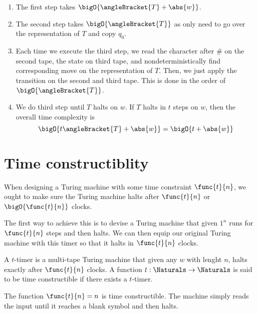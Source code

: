 \begin{enumerate}
    \item The first step takes \(\bigO{\angleBracket{T} + \abs{w}}\).
    \item The second step takes \(\bigO{\angleBracket{T}}\) as only need to go over the representation of \(T\) and copy \(q_0\).
    \item Each time we execute the third step, we read the character after \(\#\) on the second tape, the state on third tape, and nondeterministically find corresponding move on the representation of \(T\). Then, we just apply the transition on the second and third tape. This is done in the order of \(\bigO{\angleBracket{T}}\). 
    \item We do third step until \(T\) halts on \(w\). If \(T\) halts in \(t\) steps on \(w\), then the overall time complexity is 
    \begin{equation*}
        \bigO{t \angleBracket{T} + \abs{w} } = \bigO{t + \abs{w}}
    \end{equation*}
\end{enumerate}

\section{Time constructiblity}
When designing a Turing machine with some time constraint \(\func{t}{n}\), we ought to make sure the Turing machine halts after \(\func{t}{n}\) or \(\bigO{\func{t}{n}}\) clocks. 

The first way to achieve this is to devise a Turing machine that given \(1^n\) runs for \(\func{t}{n}\) steps and then halts. We can then equip our original Turing machine with this timer so that it halts in \(\func{t}{n}\) clocks.
\begin{definition}
    A \(t\)-timer is a multi-tape Turing machine that given any \(w\) with lenght \(n\), halts exactly after \(\func{t}{n}\) clocks. A function \(t:\Naturals \to \Naturals\) is said to be time constructible if there exists a \(t\)-timer. 
\end{definition}

\begin{example}
    The function \(\func{t}{n} = n\) is time constructible. The machine simply reads the input until it reaches a blank symbol and then halts.
    \begin{center}
    \end{center}
\end{example}

